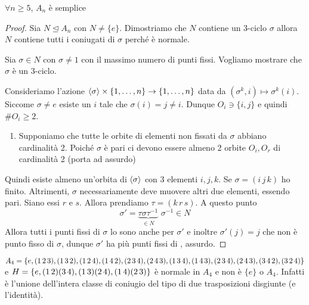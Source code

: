 \begin{theorem}
    \(\forall n \ge 5\), \(A_{n}\) è semplice
\end{theorem}
\begin{proof}
Sia \(N \trianglelefteq A_{n}\) con \(N \neq \{e\} \). Dimostriamo che \(N\)
contiene un 3-ciclo \(\sigma\) allora \(N\) contiene tutti i coniugati di
\(\sigma\) perché è normale. 

Sia \(\sigma \in N\) con \(\sigma \neq 1\) con il massimo numero di punti
fissi. Vogliamo mostrare che \(\sigma\) è un 3-ciclo.

Consideriamo l'azione \({\left\langle\sigma\right\rangle} \times \{1, \dots, n\} \to \{1, \dots, n\}
\) data da \({(\sigma^{k}, i)} \mapsto \sigma^{k}{(i)}\). Siccome \(\sigma \neq
e\) esiste un \(i\) tale che \(\sigma{(i)} = j \neq i\). Dunque \(O_i \ni \{i,
j\} \) e quindi \(\# O_i \ge  2\).

\begin{enumerate}[label = \arabic*.]
    \item Supponiamo che tutte le orbite di elementi non fissati da \(\sigma\)
        abbiano cardinalità 2. Poiché \(\sigma\) è pari ci devono essere almeno
        2 orbite \(O_i, O_r\) di cardinalità 2 (porta ad assurdo) %
\end{enumerate}
Quindi esiste almeno un'orbita di \({\left\langle\sigma\right\rangle} \) con 3 elementi \(i, j, k\).
Se \(\sigma = {(i\,j\,k)}\) ho finito. Altrimenti, \(\sigma\) necessariamente
deve muovere altri due elementi, essendo pari. Siano essi \(r\) e \(s\). Allora
prendiamo \(\tau = {(k\,r\,s)}\). A questo punto
\[
    \sigma' = \underbrace{\tau \sigma \tau^{-1}}_{\in N} \,\, \sigma^{-1} \in N
\] 
Allora tutti i punti fissi di \(\sigma\) lo sono anche per \(\sigma'\) e inoltre
\(\sigma'{(j)} = j\) che non è punto fisso di \(\sigma\), dunque \(\sigma'\) ha
più punti fissi di \sigma, assurdo.
\end{proof}
\begin{example}
    \(A_{4} = \{e, (1\,2\,3), (1\,3\,2), (1\,2\,4), (1\,4\,2),\\ (2\,3\,4),
    (2\,4\,3), (1\,3\,4), (1\,4\,3), (2\,3\,4), (2\,4\,3), (3\,4\,2),
    (3\,2\,4)\}\) e \(H = \{e, (1\,2)(3\,4), \\(1\,3)(2\,4), (1\,4)(2\,3)\}\) è
    normale in \(A_{4}\) e non è \(\{e\} \) o \(A_{4}\). Infatti è l'unione
    dell'intera classe di coniugio del tipo di due trasposizioni disgiunte (e
    l'identità).
\end{example}

